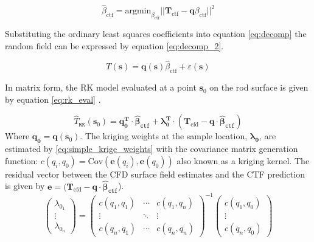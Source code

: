 \begin{equation}
\hat \beta_{\mathrm{ctf}} = \mathrm{argmin}_{\beta_{\mathrm{ctf}}} ||\mathbf T_{\mathrm{ctf}} - \mathbf q \beta_{\mathrm{ctf}}||^2
\label{eq:lin_ctf_reg}
\end{equation}

Substituting the ordinary least squares coefficients into equation \ref{eq:decomp} the random field can be expressed by equation \ref{eq:decomp_2}.

\begin{equation}
T(\mathbf s) = \mathbf q(\mathbf s) \hat \beta_{\mathrm{ctf}} + \varepsilon(\mathbf s)
\label{eq:decomp_2}
\end{equation}

In matrix form, the RK model evaluated at a point $\mathbf{s}_0 $ on the rod surface is given by equation \ref{eq:rk_eval} \cite{Hengl07}.

\begin{equation}
\hat T_\mathtt{RK}(\mathbf{s}_0 ) = \mathbf{q}_\mathbf{0}^\mathbf{T} \cdot \mathbf{\hat \beta}_\mathtt{ctf} + \mathbf{\lambda }_\mathbf{0}^\mathbf{T} \cdot (\mathbf T_{\mathrm{cfd}}
- \mathbf{q} \cdot \mathbf{\hat \beta }_\mathtt{ctf} )
\label{eq:rk_eval}
\end{equation}
Where $\mathbf{q}_\mathbf{0}= \mathbf{q}(\mathbf s_0)$. The kriging weights at the sample location, $\mathbf{\lambda_0}$, are estimated by \ref{eq:simple_krige_weights} with the covariance matrix generation function: $c(q_i, q_0)= \mathrm{Cov}(\mathbf e(q_i), \mathbf e(q_0))$ also known as a kriging kernel.  The residual vector between the CFD surface field estimates and the CTF prediction is given by $\mathbf e = (\mathbf T_{\mathrm{cfd}} - \mathbf{q} \cdot \mathbf{\hat \beta }_\mathtt{ctf}$). 
\begin{equation}
\begin{pmatrix}\lambda_{0_1} \\ \vdots \\ \lambda_{0_n} \end{pmatrix}=
\begin{pmatrix}c(q_1,q_1) & \cdots & c(q_1,q_n) \\
\vdots & \ddots & \vdots  \\
c(q_n,q_1) & \cdots & c(q_n,q_n) 
\end{pmatrix}^{-1}
\begin{pmatrix}c(q_1,q_0) \\ \vdots \\ c(q_n,q_0) \end{pmatrix}
\label{eq:simple_krige_weights}
\end{equation}

